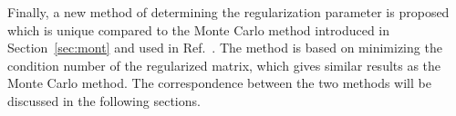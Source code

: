 Finally, a new method of determining the regularization
parameter is proposed which is unique compared to the Monte Carlo method
introduced in Section~\ref{sec:mont} and used in Ref.~\cite{bea}. The method is based on minimizing the condition number of the regularized matrix, which gives similar results as the Monte Carlo method. The correspondence between the two methods will be discussed in the following sections.




 




